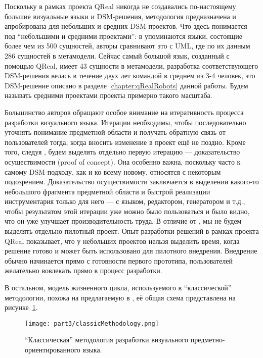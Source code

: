 Поскольку в рамках проекта QReal никогда не создавались по-настоящему большие визуальные 
языки и DSM-решения, методология предназначена и апробирована для небольших и средних DSM-проектов. 
Что здесь понимается под "`небольшими и средними проектами"': в \cite{luoma2004defining} 
упоминаются языки, состоящие более чем из 500 сущностей, авторы сравнивают это с UML, 
где по их данным 286 сущностей в метамодели. Сейчас самый большой язык, созданный с 
помощью QReal, имеет 43 сущности в метамодели, разработка соответствующего DSM-решения 
велась в течение двух лет командой в среднем из 3-4 человек, это DSM-решение описано в 
разделе \ref{chapter:qRealRobots} данной работы. Будем называть средними проектами 
проекты примерно такого масштаба.

Большинство авторов обращают особое внимание на итеративность процесса разработки 
визуального языка. Итерации необходимы, чтобы последовательно уточнять понимание предметной 
области и получать обратную связь от пользователей тогда, когда вносить изменение 
в проект ещё не поздно. Кроме того, следуя \cite{kelly2008domain}, будем выделять отдельно 
первую итерацию --- доказательство осуществимости (proof of concept). Она особенно важна, 
поскольку часто к самому DSM-подходу, как и ко всему новому, относятся с некоторым 
подозрением. Доказательство осуществимости заключается в выделении какого-то небольшого 
фрагмента предметной области и быстрой реализации инструментария только для него --- 
с языком, редактором, генератором и т.д., чтобы результатом этой итерации уже можно 
было пользоваться и было видно, что он уже улучшает производительность труда. В отличие 
от \cite{kelly2008domain}, мы не будем выделять отдельно пилотный проект. Опыт разработки 
решений в рамках проекта QReal показывает, что у небольших проектов нельзя выделить 
время, когда решение готово и может быть использовано для пилотного внедрения. Внедрение 
обычно начинается прямо с готовности первого прототипа, пользователей желательно вовлекать 
прямо в процесс разработки.

В остальном, модель жизненного цикла, используемого в "`классической"' методологии, 
похожа на предлагаемую в \cite{koznov2008development}, её общая схема представлена на 
рисунке~\ref{classicMethodology}.

\begin{figure} [ht]
	\begin{center}
		\texttt{[image: part3/classicMethodology.png]}
		\caption{"`Классическая"' методология разработки визуального предметно-ориентированного языка.}
		\label{classicMethodology}
	\end{center}
\end{figure}

